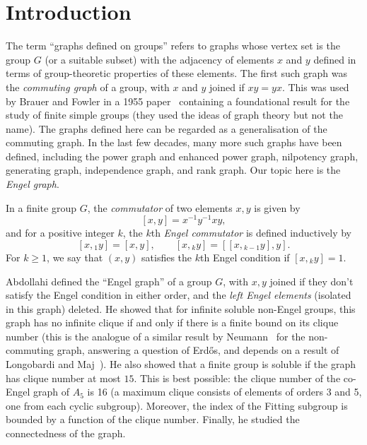 \documentclass[reqno,12pt]{amsart}
\theoremstyle{plain}
\theoremstyle{definition}
\begin{document}
\maketitle


\section{Introduction}

The term ``graphs defined on groups'' refers to graphs whose vertex set is the
group $G$ (or a suitable subset) with the adjacency of elements $x$ and $y$
defined in terms of group-theoretic properties of these elements. The first
such graph was the \emph{commuting graph} of a group, with $x$ and $y$ joined
if $xy=yx$. This was used by Brauer and Fowler in a 1955 paper~\cite{BF} 
containing a foundational result for the study of finite simple groups (they
used the ideas of graph theory but not the name). The graphs defined here can
be regarded as a generalisation of the commuting graph. In the last few decades,
many more such graphs have been defined, including the power graph and
enhanced power graph, nilpotency graph, generating graph, independence graph,
and rank graph. Our topic here is the \emph{Engel graph}.

In a finite group $G$, the \emph{commutator} of two elements $x,y$ is given by
\[[x,y]=x^{-1}y^{-1}xy,\]
and for a positive integer $k$, the $k$th \emph{Engel commutator} is defined
inductively by
\[[x,{}_1y]=[x,y],\qquad[x,{}_ky]=[[x,{}_{k-1}y],y].\]
For $k\ge1$, we say that $(x,y)$ satisfies the $k$th Engel condition if $[x,{}_ky]=1$.

Abdollahi \cite{aa} defined the ``Engel graph'' of a group $G$, 
with $x,y$ joined if they don't satisfy the Engel condition in either order,
and the \emph{left Engel elements} (isolated in this graph) deleted. He showed
that for infinite soluble non-Engel groups, this graph has no infinite clique
if and only if there is a finite bound on its clique number (this is the
analogue of a similar result by Neumann~\cite{neumann} for the non-commuting
graph, answering a question of Erd\H{o}s, and depends on a result of Longobardi
and Maj~\cite{LM}). He also showed that a finite group is soluble if the graph
has clique number at most $15$. This is best possible: the clique number of the co-Engel graph of $A_5$ is 16 (a maximum clique consists of elements of orders 3 and 5, one from each cyclic subgroup).  Moreover, the index of the Fitting subgroup is
bounded by a function of the clique number. Finally, he studied the
connectedness of the graph.
\end{document}
